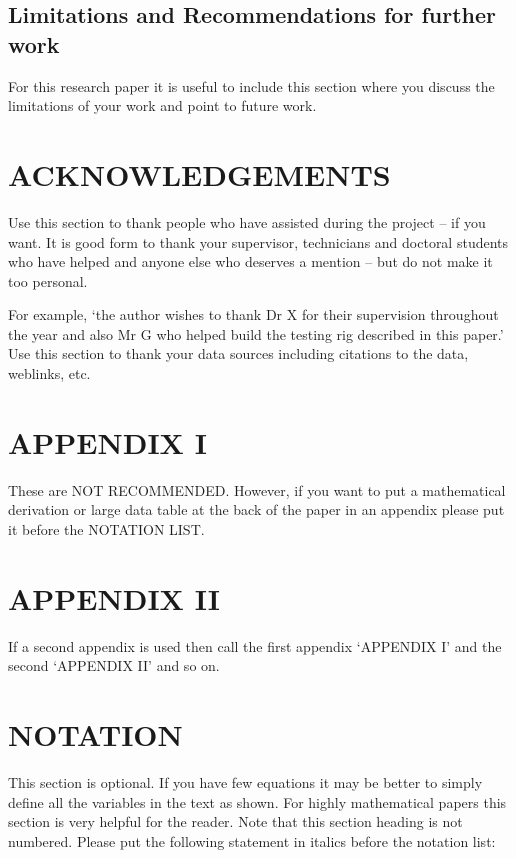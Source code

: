 \documentclass[a4paper,10pt]{article}
\begin{document}
\subsection{Limitations and Recommendations for further work}

For this research paper it is useful to include this section where you discuss the limitations of your work and point to future work.

\section{ACKNOWLEDGEMENTS}

Use this section to thank people who have assisted during the project – if you want. It is good form to thank your supervisor, technicians and doctoral students who have helped and anyone else who deserves a mention – but do not make it too personal. 

For example, ‘the author wishes to thank Dr X for their supervision throughout the year and also Mr G who helped build the testing rig described in this paper.’
Use this section to thank your data sources including citations to the data, weblinks, etc.

\section{APPENDIX I}

These are NOT RECOMMENDED. However, if you want to put a mathematical derivation or large data table at the back of the paper in an appendix please put it before the NOTATION LIST. 

\section{APPENDIX II}

If a second appendix is used then call the first appendix ‘APPENDIX I’ and the second ‘APPENDIX II’ and so on.

\section{NOTATION}

This section is optional. If you have few equations it may be better to simply define all the variables in the text as shown. For highly mathematical papers this section is very helpful for the reader. Note that this section heading is not numbered. Please put the following statement in italics before the notation list:
\end{document}
